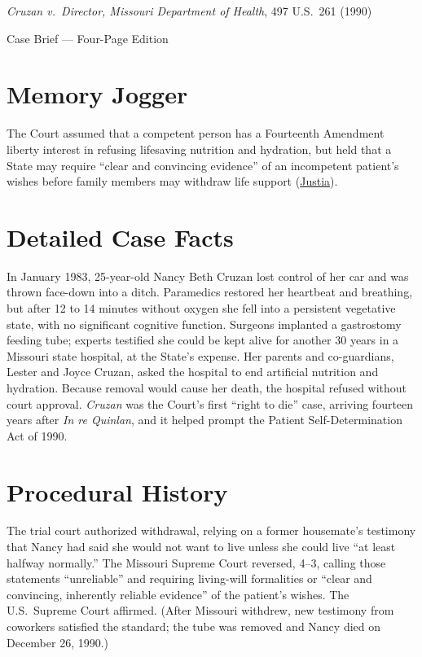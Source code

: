 \documentclass[12pt]{article}
\begin{document}
\begin{center}
{\LARGE \textit{Cruzan v.\ Director, Missouri Department of Health}, 497 U.S.\ 261 (1990)\par}
\vspace{0.8em}
{\large Case Brief --- Four-Page Edition\par}
\end{center}
\vspace{1em}

\section{Memory Jogger}

The Court assumed that a competent person has a Fourteenth Amendment liberty interest in refusing lifesaving nutrition and hydration, but held that a State may require ``clear and convincing evidence'' of an incompetent patient's wishes before family members may withdraw life support (\href{https://supreme.justia.com/cases/federal/us/497/261/}{Justia}).

\section{Detailed Case Facts}

In January 1983, 25-year-old Nancy Beth Cruzan lost control of her car and was thrown face-down into a ditch. Paramedics restored her heartbeat and breathing, but after 12 to 14 minutes without oxygen she fell into a persistent vegetative state, with no significant cognitive function. Surgeons implanted a gastrostomy feeding tube; experts testified she could be kept alive for another 30 years in a Missouri state hospital, at the State's expense. Her parents and co-guardians, Lester and Joyce Cruzan, asked the hospital to end artificial nutrition and hydration. Because removal would cause her death, the hospital refused without court approval. \textit{Cruzan} was the Court's first ``right to die'' case, arriving fourteen years after \textit{In re Quinlan}, and it helped prompt the Patient Self-Determination Act of 1990.

\section{Procedural History}

The trial court authorized withdrawal, relying on a former housemate's testimony that Nancy had said she would not want to live unless she could live ``at least halfway normally.'' The Missouri Supreme Court reversed, 4--3, calling those statements ``unreliable'' and requiring living-will formalities or ``clear and convincing, inherently reliable evidence'' of the patient's wishes. The U.S.\ Supreme Court affirmed. (After Missouri withdrew, new testimony from coworkers satisfied the standard; the tube was removed and Nancy died on December 26, 1990.)
\end{document}
